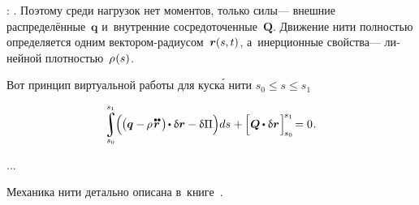 \begin{otherlanguage}{russian}

 :
    .
Поэтому среди нагрузок нет моментов, только  силы\:--- внешние распределённые~$\bm{q}$ и~внутренние сосредоточенные~$\bm{Q}$.
Движение нити полностью определяется одним вектором-радиусом~${\bm{r}(s,t)}$, а~инерционные свойства\:--- линейной плотностью~${\rho\hspace{.12ex}(s)}$.

Вот принцип виртуальной работы для куск\'{а} нити ${s_0 \leq s \leq s_1}$

\nopagebreak\vspace{-0.2em}\begin{equation}
\scalebox{0.95}{$
\displaystyle \integral\displaylimits_{\raisemath{.05em}{\mathclap{s_0}}}^{\raisemath{.15em}{\mathclap{s_1}}}
$}
\hspace{-0.25ex} \Bigl( \hspace{-0.1ex}
\bigl( \bm{q} - \hspace{-0.12ex} \rho \hspace{.2ex} \mathdotdotabove{\locationvector} \hspace{.36ex} \bigr)
\hspace{-0.25ex} \dotp \variation{\locationvector}
- \variation{\potential}
\Bigr) ds
\hspace{.1ex} + \hspace{-0.1ex} \Bigl[ \hspace{.1ex}
\bm{Q} \hspace{-0.1ex} \dotp \variation{\locationvector}
\hspace{.15ex} \Bigr]_{\hspace{-0.25ex}s_0}^{\hspace{-0.25ex}s_1}
\hspace{-0.33ex} = 0
\hspace{.1ex} .
\end{equation}

...


Механика нити детально описана в~книге~\cite{merkin-threadmechanics}.

\end{otherlanguage}

